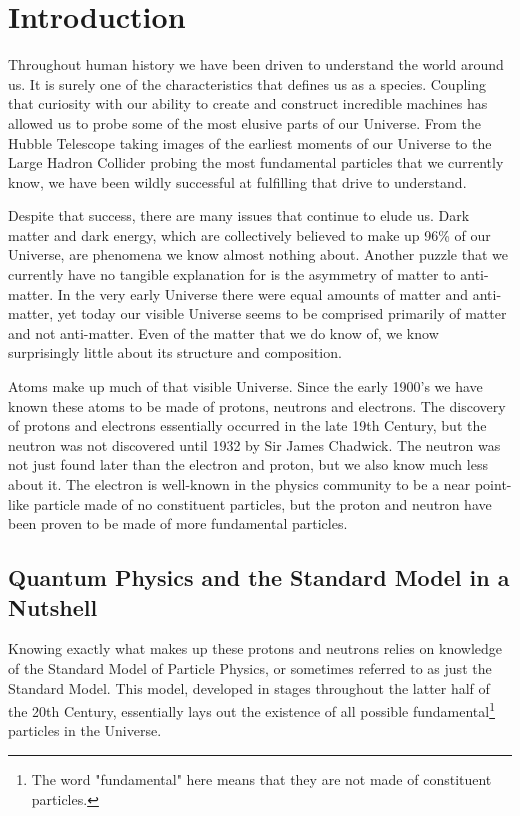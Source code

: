 \chapter{Introduction}
\label{ch:introduction}
Throughout human history we have been driven to understand the world around us. It is surely one of the characteristics that defines us as a species. Coupling that curiosity with our ability to create and construct incredible machines has allowed us to probe some of the most elusive parts of our Universe. From the Hubble Telescope taking images of the earliest moments of our Universe to the Large Hadron Collider probing the most fundamental particles that we currently know, we have been wildly successful at fulfilling that drive to understand.

Despite that success, there are many issues that continue to elude us. Dark matter and dark energy, which are collectively believed to make up 96\% of our Universe, are phenomena we know almost nothing about. Another puzzle that we currently have no tangible explanation for is the asymmetry of matter to anti-matter. In the very early Universe there were equal amounts of matter and anti-matter, yet today our visible Universe seems to be comprised primarily of matter and not anti-matter. Even of the matter that we do know of, we know surprisingly little about its structure and composition.

Atoms make up much of that visible Universe. Since the early 1900's we have known these atoms to be made of protons, neutrons and electrons. The discovery of protons and electrons essentially occurred in the late 19th Century, but the neutron was not discovered until 1932 by Sir James Chadwick. The neutron was not just found later than the electron and proton, but we also know much less about it. The electron is well-known in the physics community to be a near point-like particle made of no constituent particles, but the proton and neutron have been proven to be made of more fundamental particles.

\section{Quantum Physics and the Standard Model in a Nutshell}
Knowing exactly what makes up these protons and neutrons relies on knowledge of the Standard Model of Particle Physics, or sometimes referred to as just the Standard Model. This model, developed in stages throughout the latter half of the 20th Century, essentially lays out the existence of all possible fundamental\footnote{The word "fundamental" here means that they are not made of constituent particles.} particles in the Universe.

